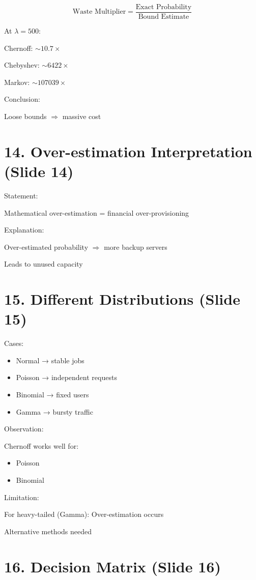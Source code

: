 \documentclass[12pt]{article}
\begin{document}
\[
\text{Waste Multiplier} = \frac{\text{Exact Probability}}{\text{Bound Estimate}}
\]

At $\lambda = 500$:

Chernoff: $\sim 10.7\times$

Chebyshev: $\sim 6422\times$

Markov: $\sim 107039\times$

Conclusion:

Loose bounds $\Rightarrow$ massive cost

\section*{14. Over-estimation Interpretation (Slide 14)}

Statement:

Mathematical over-estimation = financial over-provisioning

Explanation:

Over-estimated probability $\Rightarrow$ more backup servers

Leads to unused capacity

\section*{15. Different Distributions (Slide 15)}

Cases:
\begin{itemize}
\item Normal → stable jobs
\item Poisson → independent requests
\item Binomial → fixed users
\item Gamma → bursty traffic
\end{itemize}

Observation:

Chernoff works well for:
\begin{itemize}
\item Poisson
\item Binomial
\end{itemize}

Limitation:

For heavy-tailed (Gamma): Over-estimation occurs

Alternative methods needed

\section*{16. Decision Matrix (Slide 16)}
\end{document}
